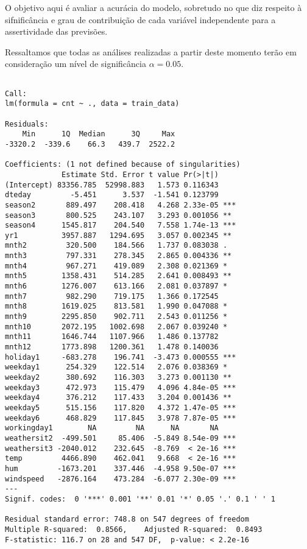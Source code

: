 \documentclass[
  letterpaper,
  DIV=11,
  numbers=noendperiod]{scrartcl}
\begin{document}
O objetivo aqui é avaliar a acurácia do modelo, sobretudo no que diz
respeito à sifnificância e grau de contribuição de cada variável
independente para a assertividade das previsões.

Ressaltamos que todas as análises realizadas a partir deste momento
terão em consideração um nível de significância \(\alpha = 0.05\).

\begin{verbatim}

Call:
lm(formula = cnt ~ ., data = train_data)

Residuals:
    Min      1Q  Median      3Q     Max 
-3320.2  -339.6    66.3   439.7  2522.2 

Coefficients: (1 not defined because of singularities)
             Estimate Std. Error t value Pr(>|t|)    
(Intercept) 83356.785  52998.883   1.573 0.116343    
dteday         -5.451      3.537  -1.541 0.123799    
season2       889.497    208.418   4.268 2.33e-05 ***
season3       800.525    243.107   3.293 0.001056 ** 
season4      1545.817    204.540   7.558 1.74e-13 ***
yr1          3957.887   1294.695   3.057 0.002345 ** 
mnth2         320.500    184.566   1.737 0.083038 .  
mnth3         797.331    278.345   2.865 0.004336 ** 
mnth4         967.271    419.089   2.308 0.021369 *  
mnth5        1358.431    514.285   2.641 0.008493 ** 
mnth6        1276.007    613.166   2.081 0.037897 *  
mnth7         982.290    719.175   1.366 0.172545    
mnth8        1619.025    813.581   1.990 0.047088 *  
mnth9        2295.850    902.711   2.543 0.011256 *  
mnth10       2072.195   1002.698   2.067 0.039240 *  
mnth11       1646.744   1107.966   1.486 0.137782    
mnth12       1773.898   1200.361   1.478 0.140036    
holiday1     -683.278    196.741  -3.473 0.000555 ***
weekday1      254.329    122.514   2.076 0.038369 *  
weekday2      380.692    116.303   3.273 0.001130 ** 
weekday3      472.973    115.479   4.096 4.84e-05 ***
weekday4      376.212    117.433   3.204 0.001436 ** 
weekday5      515.156    117.820   4.372 1.47e-05 ***
weekday6      468.829    117.845   3.978 7.87e-05 ***
workingday1        NA         NA      NA       NA    
weathersit2  -499.501     85.406  -5.849 8.54e-09 ***
weathersit3 -2040.012    232.645  -8.769  < 2e-16 ***
temp         4466.890    462.041   9.668  < 2e-16 ***
hum         -1673.201    337.446  -4.958 9.50e-07 ***
windspeed   -2876.164    473.284  -6.077 2.30e-09 ***
---
Signif. codes:  0 '***' 0.001 '**' 0.01 '*' 0.05 '.' 0.1 ' ' 1

Residual standard error: 748.8 on 547 degrees of freedom
Multiple R-squared:  0.8566,    Adjusted R-squared:  0.8493 
F-statistic: 116.7 on 28 and 547 DF,  p-value: < 2.2e-16
\end{verbatim}
\end{document}
